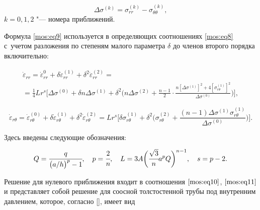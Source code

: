 \begin{equation*}

\Delta \sigma^{(k)}=\sigma^{(k)}_{rr}-\sigma^{(k)}_{\theta\theta},

\end{equation*} $ k=0, 1, 2 $ "--- номера приближений.



Формула \eqref{mos:eq9} используется в определяющих соотношениях  \eqref{mos:eq8} с~учетом разложения по степеням малого параметра $\delta$ до членов второго порядка включительно:

\begin{multline}

\label{mos:eq10}

\dot{\varepsilon}_{rr}=\dot{\varepsilon}^{0}_{rr}+\delta \dot{\varepsilon}_{rr}^{(1)} + \delta^2 \dot{\varepsilon}_{rr}^{(2)}=\\=\frac 14 Lr^s\biggl[\Delta\sigma^{(0)}+ \delta n \Delta\sigma^{(1)}+\delta^2  \biggl(n\Delta\sigma^{(2)}+\frac {n-1}{2}\cdot\frac {n[\Delta\sigma^{(1)}]^2+4[\sigma_{r\theta}^{(1)}]^2}{\Delta\sigma^{(0)}}\biggr)\biggr],

\end{multline}

\pagebreak



\begin{equation}

\label{mos:eq11}

\dot{\varepsilon}_{r\theta}=\dot{\varepsilon}^{(0)}_{r\theta}+\delta \dot{\varepsilon}_{r\theta}^{(1)} + \delta^2 \dot{\varepsilon}_{r\theta}^{(2)}= %

Lr^s \biggl[\delta\sigma_{r\theta}^{(1)}+\delta^2  \biggl( \sigma_{r\theta}^{(2)}+\frac {(n-1)\Delta\sigma^{(1)}\sigma_{r\theta}^{(1)}} {\Delta\sigma^{(0)}}\biggr)\biggr].

\end{equation}

Здесь введены следующие обозначения: 

$$Q=\cfrac{q}{\bigl(a/h\bigr)^p-1}, \quad p=\cfrac{2}{n} , \quad L=3A\biggl(\cfrac{\sqrt{3}}{n}a^pQ\biggr)^{n-1},\quad  s=p-2.$$



Решение для нулевого приближения входит в соотношения $\eqref{mos:eq10}$, $\eqref{mos:eq11}$  и представляет собой решение для соосной толстостенной трубы под внутренним давлением, которое, согласно [],  имеет вид

